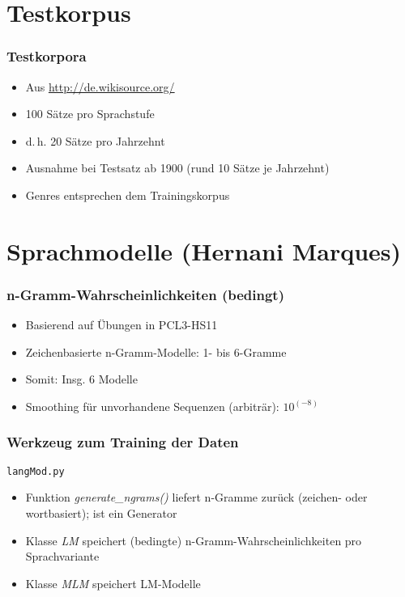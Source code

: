 \documentclass[t]{beamer} %
\begin{document}
\section{Testkorpus}

\begin{frame}
  \frametitle{Testkorpora}
  \begin{itemize}
  \item Aus \url{http://de.wikisource.org/}\pause
  \vspace*{1ex}
  \item 100 Sätze pro Sprachstufe\pause
  \item d.\,h. 20 Sätze pro Jahrzehnt\pause
  \item Ausnahme bei Testsatz ab 1900 (rund 10 Sätze je Jahrzehnt)\pause
  \vspace*{1ex}
  \item Genres entsprechen dem Trainingskorpus
  \end{itemize}  
\end{frame}

\section{Sprachmodelle (Hernani Marques)}

\begin{frame}
  \frametitle{n-Gramm-Wahrscheinlichkeiten (bedingt)}
  \begin{itemize}
  \item Basierend auf Übungen in PCL3-HS11\pause
  \vspace*{1ex}
  \item Zeichenbasierte n-Gramm-Modelle: 1- bis 6-Gramme\pause
  \item Somit: Insg. 6 Modelle \pause
  \item Smoothing für unvorhandene Sequenzen (arbiträr): $10^(-8)$
  \vspace*{1ex}
  \end{itemize}  
\end{frame}

% 
\begin{frame}
  \frametitle{Werkzeug zum Training der Daten}
  \texttt{langMod.py}
  \begin{itemize}
  \item Funktion \emph{generate\_ngrams()} liefert n-Gramme zurück (zeichen- oder wortbasiert); ist ein Generator\pause
  \item Klasse \emph{LM} speichert (bedingte) n-Gramm-Wahrscheinlichkeiten pro Sprachvariante\pause
  \item Klasse \emph{MLM} speichert LM-Modelle
  \vspace*{1ex}
  \end{itemize}  
\end{frame}
\end{document}
